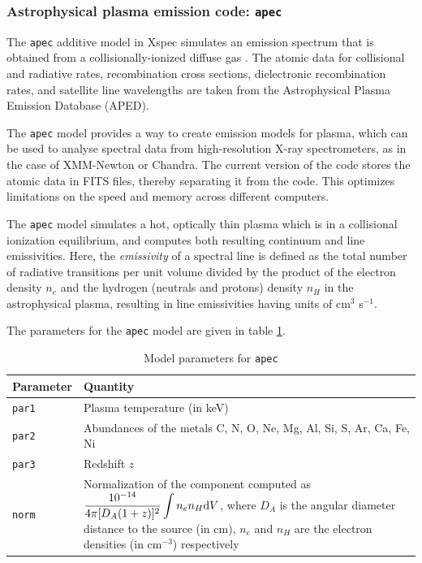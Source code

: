 			\subsubsection{Astrophysical plasma emission code: \texttt{apec}}
				The \texttt{apec} additive model in Xspec simulates an emission spectrum that is obtained from a collisionally-ionized diffuse gas \cite{smithAPEC}. The atomic data for collisional and radiative rates, recombination cross sections, dielectronic recombination rates, and satellite line wavelengths are taken from the Astrophysical Plasma Emission Database (APED).
			
				The \texttt{apec} model provides a way to create emission models for plasma, which can be used to analyse spectral data from high-resolution X-ray spectrometers, as in the case of XMM-Newton or Chandra. The current version of the code stores the atomic data in FITS files, thereby separating it from the code. This optimizes limitations on the speed and memory across different computers.
			
				The \texttt{apec} model simulates a hot, optically thin plasma which is in a collisional ionization equilibrium, and computes both resulting continuum and line emissivities. Here, the \textit{emissivity} of a spectral line is defined as the  total number of radiative transitions per unit volume divided by the product of the electron density $n_e$ and the hydrogen (neutrals and protons) density $n_H$ in the astrophysical plasma, resulting in line emissivities having units of cm$^3$ s$^{-1}$.
			
				The parameters for the \texttt{apec} model are given in table \ref{param:apec}.
				\begin{table}[h!]
					\centering
					\caption{Model parameters for \texttt{apec}}
					\label{param:apec}
					\begin{tabular}{p{}p{}}
						\hline
						\textbf{Parameter} & \textbf{Quantity} \\ \hline
						{\texttt{par1}} & {Plasma temperature (in keV)} \\ %
						{\texttt{par2}} & {Abundances of the metals C, N, O, Ne, Mg, Al, Si, S, Ar, Ca, Fe, Ni} \\ %
						{\texttt{par3}} & {Redshift $z$} \\ %
						{\texttt{norm}} & {Normalization of the component computed as $\displaystyle\dfrac{10^{-14}}{4\pi[D_A(1+z)]^2}\int{n_en_H\mathrm{d}V}$, where $D_A$ is the angular diameter distance to the source (in cm), $n_e$ and $n_H$ are the electron densities (in cm$^{-3}$) respectively} \\ \hline
					\end{tabular}
				\end{table}

